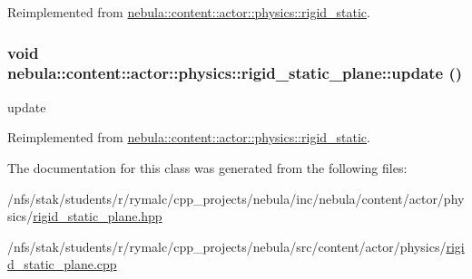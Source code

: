 Reimplemented from \hyperlink{classnebula_1_1content_1_1actor_1_1physics_1_1rigid__static_a83be7bda449d94b5d7a69c8b8f99f6de}{nebula::content::actor::physics::rigid\_\-static}.\hypertarget{classnebula_1_1content_1_1actor_1_1physics_1_1rigid__static__plane_ab42f682ba60457dc596613690b57517e}{
\subsubsection[{update}]{\setlength{\rightskip}{0pt plus 5cm}void nebula::content::actor::physics::rigid\_\-static\_\-plane::update ()}}
\label{classnebula_1_1content_1_1actor_1_1physics_1_1rigid__static__plane_ab42f682ba60457dc596613690b57517e}


update 

Reimplemented from \hyperlink{classnebula_1_1content_1_1actor_1_1physics_1_1rigid__static_a8ecc4b9b308562ab3942bdac5b8ddfea}{nebula::content::actor::physics::rigid\_\-static}.

The documentation for this class was generated from the following files:\begin{DoxyCompactItemize}
\item 
/nfs/stak/students/r/rymalc/cpp\_\-projects/nebula/inc/nebula/content/actor/physics/\hyperlink{physics_2rigid__static__plane_8hpp}{rigid\_\-static\_\-plane.hpp}\item 
/nfs/stak/students/r/rymalc/cpp\_\-projects/nebula/src/content/actor/physics/\hyperlink{physics_2rigid__static__plane_8cpp}{rigid\_\-static\_\-plane.cpp}\end{DoxyCompactItemize}
